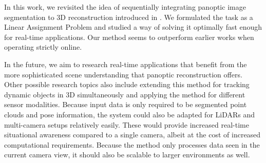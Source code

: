


In this work, we revisited the idea of sequentially integrating panoptic image segmentation to 3D reconstruction introduced in \cite{panopticfusion}. We formulated the task as a Linear Assignment Problem and studied a way of solving it optimally fast enough for real-time applications. Our method seems to outperform earlier works when operating strictly online.

In the future, we aim to research real-time applications that benefit from the more sophisticated scene understanding that panoptic reconstruction offers. Other possible research topics also include extending this method for tracking dynamic objects in 3D simultaneously and applying the method for different sensor modalities. Because input data is only required to be segmented point clouds and pose information, the system could also be adapted for LiDARs and multi-camera setups relatively easily. These would provide increased real-time situational awareness compared to a single camera, albeit at the cost of increased computational requirements. Because the method only processes data seen in the current camera view, it should also be scalable to larger environments as well.
